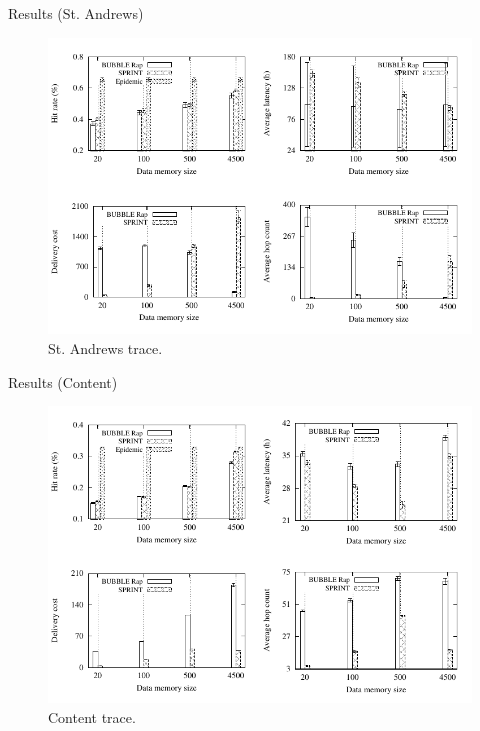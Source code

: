 \documentclass{beamer}
\begin{document}
\begin{frame}{Results (St. Andrews)}
	\begin{figure}[!t]
		\centering
		\includegraphics[scale=0.75]{img/stan}
		\caption{\label{fig:stan}St. Andrews trace.}
	\end{figure}
\end{frame}

\begin{frame}{Results (Content)}
	\begin{figure}[!t]
		\centering
		\includegraphics[scale=0.75]{img/content}
		\caption{\label{fig:content}Content trace.}
	\end{figure}
\end{frame}
\end{document}
